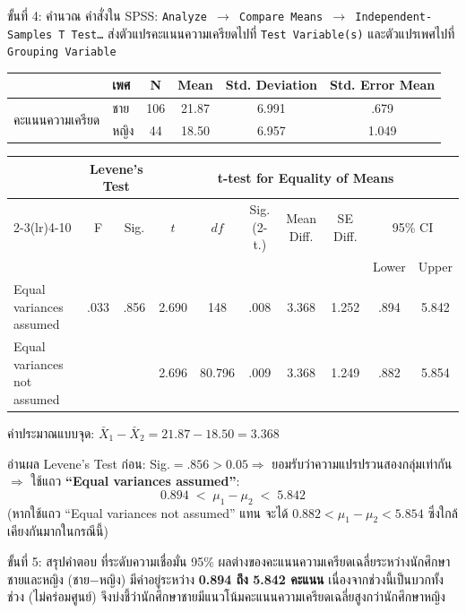 \documentclass[10pt]{extarticle}
\newcommand{\spssout}[1]{\vspace{2pt}\noindent{\small\textbf{\textcolor{compfr}{Output -- #1}}}\par\vspace{1pt}}
\begin{document}
\begin{stepbox}{ขั้นที่ 4: คำนวณ}
คำสั่งใน SPSS: \texttt{Analyze $\to$ Compare Means $\to$ Independent-Samples T Test\dots} ส่งตัวแปรคะแนนความเครียดไปที่ \texttt{Test Variable(s)} และตัวแปรเพศไปที่ \texttt{Grouping Variable}

\spssout{SPSS จากไฟล์ต้นฉบับ}
\begin{center}\small
\begin{tabular}{@{}llcccc@{}}
\toprule
& เพศ & N & Mean & Std. Deviation & Std. Error Mean\\
\midrule
\multirow{2}{*}{คะแนนความเครียด} & ชาย & 106 & 21.87 & 6.991 & .679\\
& หญิง & 44 & 18.50 & 6.957 & 1.049\\
\bottomrule
\end{tabular}
\end{center}
\begin{center}\tiny
\begin{tabular}{@{}l cc ccc cc cc@{}}
\toprule
& \multicolumn{2}{c}{Levene's Test} & \multicolumn{7}{c}{t-test for Equality of Means}\\
\cmidrule(lr){2-3}\cmidrule(lr){4-10}
& F & Sig. & $t$ & $df$ & Sig.(2-t.) & Mean Diff. & SE Diff. & \multicolumn{2}{c}{95\% CI}\\
& & & & & & & & Lower & Upper\\
\midrule
Equal variances assumed & .033 & .856 & 2.690 & 148 & .008 & 3.368 & 1.252 & .894 & 5.842\\
Equal variances not assumed & & & 2.696 & 80.796 & .009 & 3.368 & 1.249 & .882 & 5.854\\
\bottomrule
\end{tabular}
\end{center}
ค่าประมาณแบบจุด: $\bar X_1-\bar X_2 = 21.87-18.50 = 3.368$

อ่านผล Levene's Test ก่อน: Sig.$=.856>0.05 \Rightarrow$ ยอมรับว่าความแปรปรวนสองกลุ่มเท่ากัน $\Rightarrow$ ใช้แถว \textbf{``Equal variances assumed''}:
$$0.894 \;<\; \mu_1-\mu_2 \;<\; 5.842$$
(หากใช้แถว ``Equal variances not assumed'' แทน จะได้ $0.882<\mu_1-\mu_2<5.854$ ซึ่งใกล้เคียงกันมากในกรณีนี้)
\end{stepbox}

\begin{stepbox}{ขั้นที่ 5: สรุปคำตอบ}
ที่ระดับความเชื่อมั่น 95\% ผลต่างของคะแนนความเครียดเฉลี่ยระหว่างนักศึกษาชายและหญิง (ชาย$-$หญิง) มีค่าอยู่ระหว่าง \textbf{0.894 ถึง 5.842 คะแนน} เนื่องจากช่วงนี้เป็นบวกทั้งช่วง (ไม่คร่อมศูนย์) จึงบ่งชี้ว่านักศึกษาชายมีแนวโน้มคะแนนความเครียดเฉลี่ยสูงกว่านักศึกษาหญิง
\end{stepbox}
\end{document}
